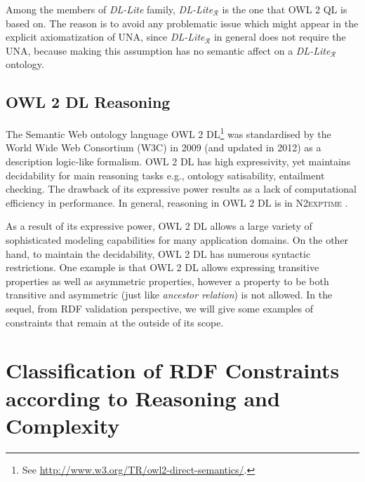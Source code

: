 \documentclass{llncs}
\begin{document}
Among the members of \textit{DL-Lite} family, \textit{DL-Lite}$_\mathcal{R}$ is the one that OWL 2 QL is based on. The reason is to avoid any problematic issue which might appear in the explicit axiomatization of UNA, since  \textit{DL-Lite}$_\mathcal{R}$ in general does not require the UNA, because making this assumption has no semantic affect on a \textit{DL-Lite}$_\mathcal{R}$ ontology.

\subsection{OWL 2 DL Reasoning}



The Semantic Web ontology language OWL 2 DL\footnote{See \url{http://www.w3.org/TR/owl2-direct-semantics/}.} was standardised by
the World Wide Web Consortium (W3C) in 2009 (and updated in 2012) as a
description logic-like formalism.  OWL 2 DL has high expressivity, yet maintains  decidability for main reasoning tasks e.g., ontology satisability, 
entailment checking. The drawback of its expressive power results as a lack of computational efficiency in performance. In general, reasoning in OWL 2 DL is in \textsc{N2exptime} \cite{owl2profiles2008}. 

As a result of its expressive power, OWL 2 DL allows a large variety of sophisticated modeling capabilities for many application domains.  On the other hand, to maintain the decidability, OWL 2 DL has numerous syntactic restrictions. One example is that OWL 2 DL allows  expressing transitive properties as well as asymmetric properties, however a property to be both transitive and asymmetric (just like \emph{ancestor relation}) is not allowed. In the sequel, from RDF validation perspective, we will give some examples of constraints that remain at the outside of its scope. 

\section{Classification of RDF Constraints according to Reasoning and Complexity}
\label{Classification-RDF-Constraints-Reasoning-Complexity}

\end{document}
